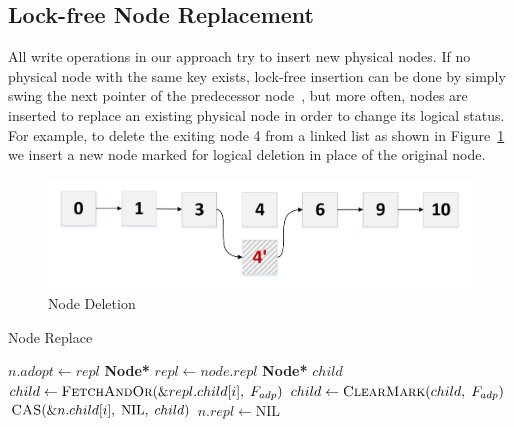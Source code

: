 \documentclass[10pt,conference,compsocconf]{IEEEtran}
\newcommand\NIL{\text{NIL}}
\newcommand\TRUE{\text{\textbf{true}}}
\newcommand\FALSE{\text{\textbf{false}}}
\begin{document}
\subsection{Lock-free Node Replacement}
\label{sec:noderepl}
All write operations in our approach try to insert new physical nodes.
If no physical node with the same key exists, lock-free insertion can be done by simply swing the next pointer of the predecessor node~\cite{zhang2015lockfree,harris2001pragmatic}, but more often, nodes are inserted to replace an existing physical node in order to change its logical status.
For example, to delete the exiting node 4 from a linked list as shown in Figure~\ref{fig:nodedeletion} we insert a new node marked for logical deletion in place of the original node.
\begin{figure}[h]
    \centering
    \includegraphics[width=0.8\columnwidth]{figure/deletion.pdf}
    \caption{Node Deletion}
    \label{fig:nodedeletion}
\end{figure}

\begin{algorithm}[h]
    \caption{Node Replace}
    \label{alg:replace}
    \begin{algorithmic}[1]
        \State $n.adopt \gets repl$
         \label{l:link}
        \State {} \label{l:adoptself}
        \State \Return \TRUE
        \Else
        \State \Return \FALSE
        \EndIf
        \EndFunction
        \Statex
        \State \textbf{Node*} $repl \gets node.repl$
        \If {$repl=\NIL$}
        \State \Return
        \EndIf
        \State \textbf{Node*} $child$ 
        \For {$i \in [0, N)$} \label{l:adoptionfor}
        \State $child \gets \textsc{FetchAndOr}(\&repl.child[i],\;F_{adp})$ \label{l:setadp} 
        \State $child \gets \textsc{ClearMark}(child,\;F_{adp})$
        \State $\text{\textsc{CAS}}(\&n.child[i],\;\NIL,\;child)$ \label{l:adopt}
        \EndFor
        \State $n.repl \gets \NIL$
        \EndFunction
        \end{algorithmic}
\end{algorithm}
\end{document}
